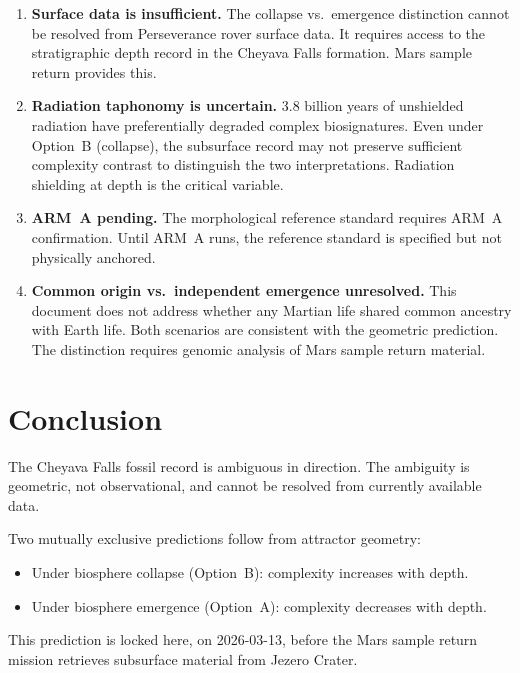 \documentclass[11pt, a4paper]{article}
\begin{document}
\begin{enumerate}[leftmargin=*, label=(\arabic*)]
\item \textbf{Surface data is insufficient.}
  The collapse vs.\ emergence distinction cannot
  be resolved from Perseverance rover surface data.
  It requires access to the stratigraphic depth
  record in the Cheyava Falls formation.
  Mars sample return provides this.

\item \textbf{Radiation taphonomy is uncertain.}
  3.8 billion years of unshielded radiation have
  preferentially degraded complex biosignatures.
  Even under Option~B (collapse), the subsurface
  record may not preserve sufficient complexity
  contrast to distinguish the two interpretations.
  Radiation shielding at depth is the critical
  variable.

\item \textbf{ARM~A pending.}
  The morphological reference standard requires
  ARM~A confirmation.
  Until ARM~A runs, the reference standard is
  specified but not physically anchored.

\item \textbf{Common origin vs.\ independent
  emergence unresolved.}
  This document does not address whether any
  Martian life shared common ancestry with Earth
  life. Both scenarios are consistent with the
  geometric prediction. The distinction requires
  genomic analysis of Mars sample return material.
\end{enumerate}

\section{Conclusion}

The Cheyava Falls fossil record is ambiguous in
direction. The ambiguity is geometric, not
observational, and cannot be resolved from
currently available data.

Two mutually exclusive predictions follow from
attractor geometry:

\begin{itemize}[leftmargin=*]
\item Under biosphere collapse (Option~B):
  complexity increases with depth.
\item Under biosphere emergence (Option~A):
  complexity decreases with depth.
\end{itemize}

This prediction is locked here, on 2026-03-13,
before the Mars sample return mission retrieves
subsurface material from Jezero Crater.
\end{document}
